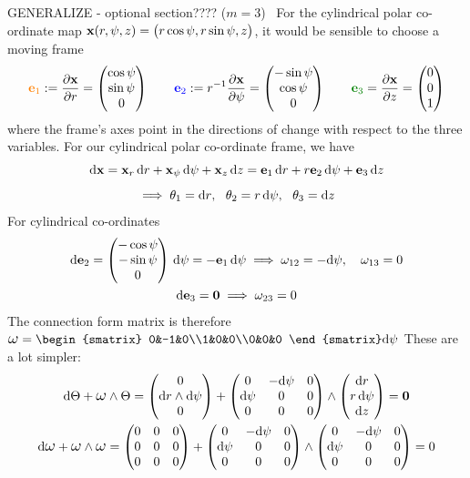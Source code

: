 GENERALIZE - optional section???? ($m=3$) \ For the cylindrical polar co-ordinate map ${\mathbf{x}}(r,\psi,z)=\bigl(r\cos\psi,r\sin\psi,z\bigr)$, it would be sensible to choose a moving frame
	\[\textcolor{orange}{\ve_1}:=\partials[\vx]{r}=\threevec{\cos\psi}{\sin\psi}{0} \qquad \textcolor{blue}{\ve_2}:=r^{-1}\partials[\vx]{\psi}=\threevec{-\sin\psi}{\cos\psi}{0} \qquad \textcolor{Green}{\ve_3}=\partials[\vx]{z}=\threevec 001\]
	where the frame's axes point in the directions of change with respect to the three variables. %
	For our cylindrical polar co-ordinate frame, we have
		\begin{gather*}
		\mathrm{d}{\mathbf{x}}={\mathbf{x}}_r\,{\mathrm{d} r}+{\mathbf{x}}_\psi\,\mathrm{d}\psi+{\mathbf{x}}_z\,{\mathrm{d} z}={\mathbf{e}}_1\,{\mathrm{d} r}+r{\mathbf{e}}_2\,\mathrm{d}\psi+{\mathbf{e}}_3\,{\mathrm{d} z}\\[5pt]
		\implies \theta_1={\mathrm{d} r},\ \ \theta_2=r\,\mathrm{d}\psi,\ \ \theta_3={\mathrm{d} z}
		\end{gather*}
		 For cylindrical co-ordinates
	\begin{gather*}
	\mathrm{d}{\mathbf{e}}_2=\begin{pmatrix}-\cos\psi\\-\sin\psi\\0\end{pmatrix}\,\mathrm{d}\psi=-{\mathbf{e}}_1\,\mathrm{d}\psi\implies \omega_{12}=-\mathrm{d}\psi,\quad\omega_{13}=0\\
	\mathrm{d}{\mathbf{e}}_3=\mathbf{0}\implies \omega_{23}=0
	\end{gather*}
	The connection form matrix is therefore $\lomega=\begin{smatrix}
	0&-1&0\\1&0&0\\0&0&0
	\end{smatrix}\D\psi$
	 These are a lot simpler:
	\begin{gather*}
	\D\Theta+\lomega\wedge\Theta =\threevec{0}{\dr\wedge\D\psi}{0} +\begin{pmatrix}
	0&-\D\psi&0\\\D\psi&0&0\\0&0&0
	\end{pmatrix}\wedge\threevec{\dr}{r\,\D\psi}{\dz}=\V0\\
	\D\lomega+\lomega\wedge\lomega =\begin{pmatrix}
	0&0&0\\0&0&0\\0&0&0
	\end{pmatrix}
	+
	\begin{pmatrix}
	0&-\D\psi&0\\\D\psi&0&0\\0&0&0
	\end{pmatrix}
	\wedge
	\begin{pmatrix}
	0&-\D\psi&0\\\D\psi&0&0\\0&0&0
	\end{pmatrix}
	=0
	\end{gather*}
	
